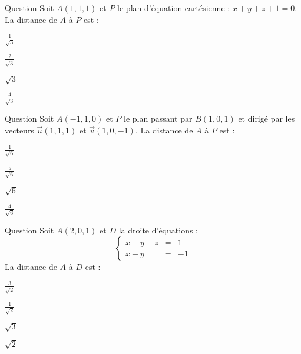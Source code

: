 \begin{multi}[multiple,feedback=
{Si \(P\) est d'équation  \(ax+by+cz+d=0\) et \(A(x_0,y_0,z_0)\), la distance de \(A\) à \(P\) est donnée par : \(\frac{|ax_0+by_0+cz_0+d|}{\sqrt{a^2+b^2+c^2}}\).
}]{Question}
Soit \(A(1,1,1)\) et \(P\) le plan d'équation cartésienne : \(x+y+z+1=0\). La distance de \(A\) à \(P\) est :

    \item \(\frac{1}{\sqrt 3}\)
    \item \(\frac{2}{\sqrt 3}\)
    \item \(\sqrt 3\)
    \item* \(\frac{4}{\sqrt 3}\)
\end{multi}


\begin{multi}[multiple,feedback=
{Si \(P\) passe par un point \(B\) et est dirigé par des vecteurs \(\vec{u}\) et \(\vec{v}\) et \(A\) un point, la distance de \(A\) à \(P\) est donnée par : \(\frac{ \vert \det (\overrightarrow{BA}, \vec{u},\vec{v})\vert}{\Vert \vec{u} \wedge \vec{v}\Vert}\).
}]{Question}
Soit \(A(-1,1,0)\) et \(P\) le plan passant par \(B(1,0,1)\) et dirigé par les vecteurs \(\vec{u}(1,1,1)\) et \(\vec{v}(1,0,-1)\). La distance de \(A\) à \(P\) est :

    \item \(\frac{1}{\sqrt 6}\)
    \item* \(\frac{5}{\sqrt 6}\)
    \item \(\sqrt 6\)
    \item \(\frac{4}{\sqrt 6}\)
\end{multi}


\begin{multi}[multiple,feedback=
{Si \(D\) est une droite qui passe par un point \(B\) et dirigée par un vecteur \(\vec{u}\)  et \(A\) un point, la distance de \(A\) à \(D\) est donnée par : \(\frac{ \Vert \overrightarrow{BA} \wedge \vec{u} \Vert}{\Vert \vec{u}  \Vert}\).
}]{Question}
Soit \(A(2,0,1)\) et \(D\) la droite d'équations :
\[\left\{\begin{array}{ccl}x+y-z&=&1\\x-y&=&-1 \end{array}\right.\]
La distance de \(A\) à \(D\) est :

    \item* \(\frac{3}{\sqrt 2}\)
    \item \(\frac{1}{\sqrt 2}\)
    \item \(\sqrt 3\)
    \item \(\sqrt 2\)
\end{multi}


